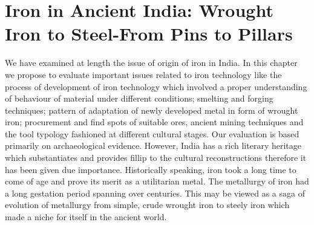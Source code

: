 \chapter{Iron in Ancient India: Wrought Iron to Steel-From Pins to Pillars}\label{chapter4}


We have examined at length the issue of origin of iron in India. In this chapter we propose to evaluate important issues related to iron technology like the process of development of iron technology which involved a proper understanding of behaviour of material under different conditions; smelting and forging techniques; pattern of adaptation of newly developed metal in form of wrought iron; procurement and find spots of suitable ores, ancient mining techniques and the tool typology fashioned at different cultural stages. Our evaluation is based primarily on archaeological evidence. However, India has a rich literary heritage which substantiates and provides fillip to the cultural reconstructions therefore it has been given due importance. Historically speaking, iron took a long time to come of age and prove its merit as a utilitarian metal. The metallurgy of iron had a long gestation period spanning over centuries. This may be viewed as a saga of evolution of metallurgy from simple, crude wrought iron to steely iron which made a niche for itself in the ancient world. 


